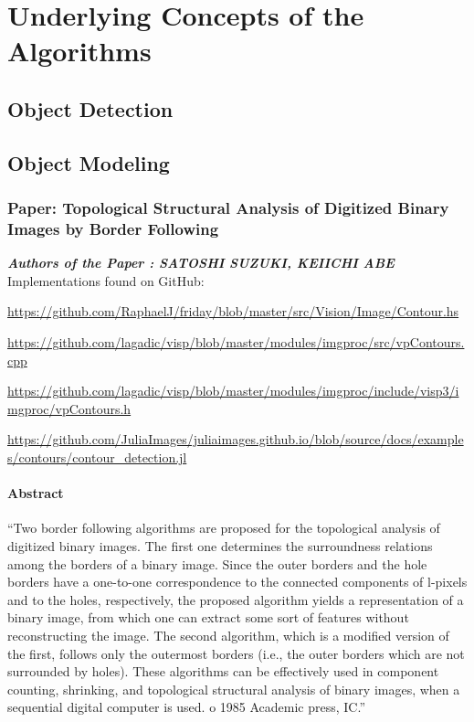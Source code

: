 \documentclass[a4paper,12pt]{book}%
\begin{document}
\chapter{Underlying Concepts of the Algorithms}

\section{Object Detection}

\section{Object Modeling}

\subsection{Paper: Topological Structural Analysis of Digitized Binary	Images by 	Border Following}

\textbf{\textit{Authors of the Paper : SATOSHI SUZUKI, KEIICHI ABE}}\\

Implementations found on GitHub:\\

{\footnotesize \url{https://github.com/RaphaelJ/friday/blob/master/src/Vision/Image/Contour.hs}

\url{https://github.com/lagadic/visp/blob/master/modules/imgproc/src/vpContours.cpp} 

\url{https://github.com/lagadic/visp/blob/master/modules/imgproc/include/visp3/imgproc/vpContours.h}

\url{https://github.com/JuliaImages/juliaimages.github.io/blob/source/docs/examples/contours/contour_detection.jl}}

\subsubsection{Abstract}

``Two border following algorithms are proposed for the topological analysis of digitized binary images. The first one determines the surroundness relations among the borders of a binary image. Since the outer borders and the hole borders have a one-to-one correspondence to the connected components of l-pixels and to the holes, respectively, the proposed algorithm yields a representation of a binary image, from which one can extract some sort of features without reconstructing the image. The second algorithm, which is a modified version of the first, follows only the outermost borders (i.e., the outer borders which are not surrounded by holes). These algorithms can be effectively used in component counting, shrinking, and topological structural analysis of binary images, when a sequential digital computer is used. o 1985 Academic press, IC.''\\
\end{document}
